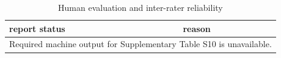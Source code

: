 \begin{table}[htbp]
\centering
\caption{Human evaluation and inter-rater reliability}
\label{tab:s10}
\begin{tabular}{ll}
\hline
report status & reason \\
\hline
\multicolumn{2}{l}{Required machine output for Supplementary Table S10 is unavailable.} \\
\hline
\end{tabular}
\end{table}

